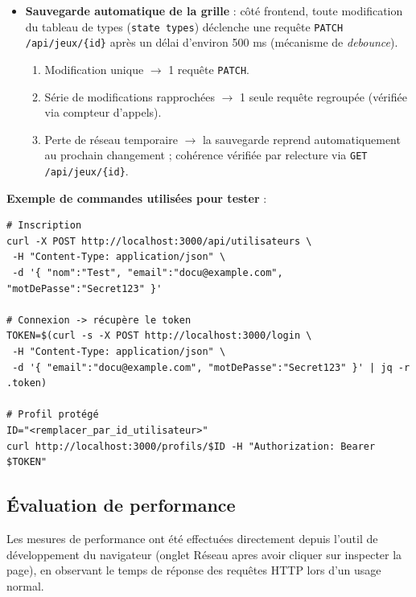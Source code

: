\documentclass[12pt]{article}        %
\begin{document}
\begin{itemize}
    \item \textbf{Sauvegarde automatique de la grille} : côté frontend, toute modification du tableau de types (\texttt{state types}) déclenche une requête \texttt{PATCH /api/jeux/\{id\}} après un délai d’environ 500 ms (mécanisme de \textit{debounce}).
    \begin{enumerate}
      \item Modification unique $\rightarrow$ 1 requête \texttt{PATCH}.
      \item Série de modifications rapprochées $\rightarrow$ 1 seule requête regroupée (vérifiée via compteur d’appels).
      \item Perte de réseau temporaire $\rightarrow$ la sauvegarde reprend automatiquement au prochain changement ; cohérence vérifiée par relecture via \texttt{GET /api/jeux/\{id\}}.
    \end{enumerate}
  \end{itemize}
  \vspace{0.5em}
\noindent\textbf{Exemple de commandes utilisées pour tester} :

\begin{verbatim}
# Inscription
curl -X POST http://localhost:3000/api/utilisateurs \
 -H "Content-Type: application/json" \
 -d '{ "nom":"Test", "email":"docu@example.com", "motDePasse":"Secret123" }'

# Connexion -> récupère le token
TOKEN=$(curl -s -X POST http://localhost:3000/login \
 -H "Content-Type: application/json" \
 -d '{ "email":"docu@example.com", "motDePasse":"Secret123" }' | jq -r .token)

# Profil protégé
ID="<remplacer_par_id_utilisateur>"
curl http://localhost:3000/profils/$ID -H "Authorization: Bearer $TOKEN"
\end{verbatim}


\subsection{Évaluation de performance}
\label{subsec:performance}
Les mesures de performance ont été effectuées directement depuis l’outil de développement du navigateur (onglet Réseau apres avoir cliquer sur inspecter la page), en observant le temps de réponse des requêtes HTTP lors d’un usage normal.
\end{document}
